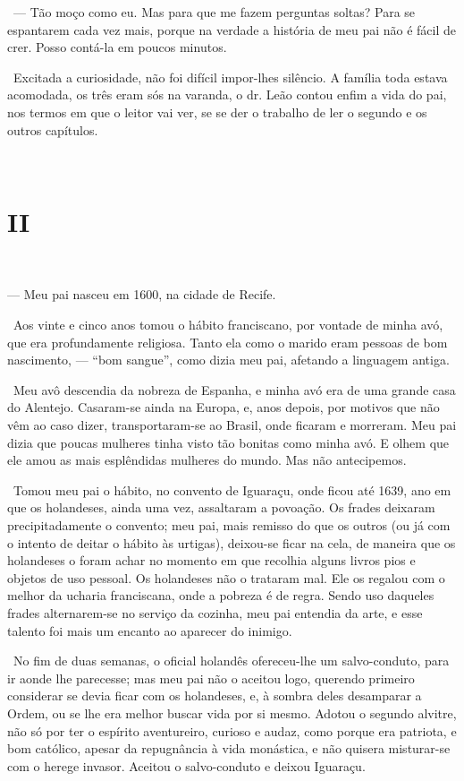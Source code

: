 ~--- Tão moço como eu. Mas para que me fazem perguntas soltas? Para se
espantarem cada vez mais, porque na verdade a história de meu pai não é
fácil de crer. Posso contá-la em poucos minutos.

~Excitada a curiosidade, não foi difícil impor-lhes silêncio. A família
toda estava acomodada, os três eram sós na varanda, o dr. Leão contou
enfim a vida do pai, nos termos em que o leitor vai ver, se se der o
trabalho de ler o segundo e os outros capítulos.

~~

\section{II}

~

--- Meu pai nasceu em 1600, na cidade de Recife.

~Aos vinte e cinco anos tomou o hábito franciscano, por vontade de minha
avó, que era profundamente religiosa. Tanto ela como o marido eram
pessoas de bom nascimento, --- ``bom sangue'', como dizia meu pai,
afetando a linguagem antiga.

~Meu avô descendia da nobreza de Espanha, e minha avó era de uma grande
casa do Alentejo. Casaram-se ainda na Europa, e, anos depois, por
motivos que não vêm ao caso dizer, transportaram-se ao Brasil, onde
ficaram e morreram. Meu pai dizia que poucas mulheres tinha visto tão
bonitas como minha avó. E olhem que ele amou as mais esplêndidas
mulheres do mundo. Mas não antecipemos.

~Tomou meu pai o hábito, no convento de Iguaraçu, onde ficou até 1639,
ano em que os holandeses, ainda uma vez, assaltaram a povoação. Os
frades deixaram precipitadamente o convento; meu pai, mais remisso do
que os outros (ou já com o intento de deitar o hábito às urtigas),
deixou-se ficar na cela, de maneira que os holandeses o foram achar no
momento em que recolhia alguns livros pios e objetos de uso pessoal. Os
holandeses não o trataram mal. Ele os regalou com o melhor da ucharia
franciscana, onde a pobreza é de regra. Sendo uso daqueles frades
alternarem-se no serviço da cozinha, meu pai entendia da arte, e esse
talento foi mais um encanto ao aparecer do inimigo.

~No fim de duas semanas, o oficial holandês ofereceu-lhe um
salvo-conduto, para ir aonde lhe parecesse; mas meu pai não o aceitou
logo, querendo primeiro considerar se devia ficar com os holandeses, e,
à sombra deles desamparar a Ordem, ou se lhe era melhor buscar vida por
si mesmo. Adotou o segundo alvitre, não só por ter o espírito
aventureiro, curioso e audaz, como porque era patriota, e bom católico,
apesar da repugnância à vida monástica, e não quisera misturar-se com o
herege invasor. Aceitou o salvo-conduto e deixou Iguaraçu.

